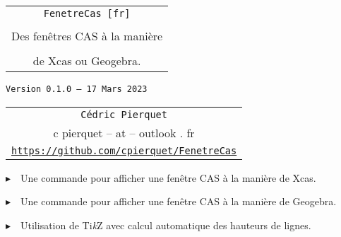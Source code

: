 \documentclass[french,a4paper,11pt]{article}
\def\TPversion{0.1.0}
\def\TPdate{17 Mars 2023}
\providecommand\tikzlogo{Ti\textit{k}Z}
\let\TikZ\tikzlogo
\begin{document}
\setlength{\aweboxleftmargin}{0.07\linewidth}
\setlength{\aweboxcontentwidth}{0.93\linewidth}
\setlength{\aweboxvskip}{8pt}

\pagestyle{fancy}

\thispagestyle{empty}

\vspace{2cm}

\begin{center}
	\begin{minipage}{0.75\linewidth}
	\begin{tcolorbox}[colframe=yellow,colback=yellow!15]
		\begin{center}
			\begin{tabular}{c}
				{\Huge \texttt{FenetreCas [fr]}}\\
				\\
				{\LARGE Des fenêtres CAS à la manière} \\
				\\
				{\LARGE de Xcas ou Geogebra.} \\
			\end{tabular}
			
			\bigskip
			
			{\small \texttt{Version \TPversion{} -- \TPdate}}
		\end{center}
	\end{tcolorbox}
\end{minipage}
\end{center}

\begin{center}
	\begin{tabular}{c}
	\texttt{Cédric Pierquet}\\
	{\ttfamily c pierquet -- at -- outlook . fr}\\
	\texttt{\url{https://github.com/cpierquet/FenetreCas}}
\end{tabular}
\end{center}

\vspace{0.25cm}

{$\blacktriangleright$~~Une commande pour afficher une fenêtre CAS à la manière de \textsf{Xcas}.}

\smallskip

{$\blacktriangleright$~~Une commande pour afficher une fenêtre CAS à la manière de \textsf{Geogebra}.}

\smallskip

{$\blacktriangleright$~~Utilisation de \TikZ{} avec calcul automatique des hauteurs de lignes.}
\end{document}
